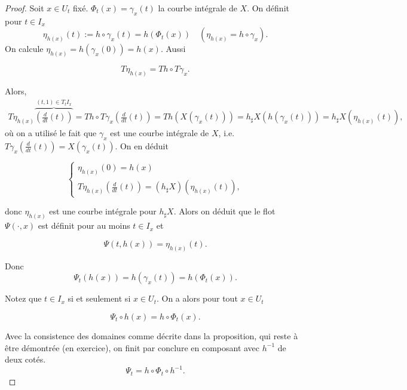 \documentclass[french]{article}
\theoremstyle{definition}
\begin{document}
\begin{proof}
  Soit $x\in U_t$ fix\'e. \(\Phi_t (x)  = \gamma_x(t)\) la courbe intégrale de \(X\). On d\'efinit pour $t\in I_x$
  \[
  \eta _{h(x)}(t) := h \circ \gamma_x(t) = h(\Phi_t(x)) \quad (\eta _{h(x)} = h \circ \gamma_x).
  \] On calcule \(\eta _{h(x)} = h(\gamma_x(0)) = h(x)\). Aussi

  \[T{\eta _{h(x)}} = T h \circ T \gamma_x.\]

  Alors,
    \begin{gather*}
    T{\eta _{h(x)}} \overbrace{\left( \frac{d}{dt}(t)\right) }^{(t,1)\in T_tI_x} = T h \circ {T{\gamma_x}\left(\frac{d}{dt}(t)\right)}  = Th(X (\gamma_x(t))) = h _{\sharp}X(h(\gamma_x(t))) = h _{\sharp}X(\eta _{h(x)}(t)),
  \end{gather*} o\`u on a utilis\'e  le fait que $\gamma_x$ est une courbe int\'egrale de $X$, i.e. ${T{\gamma_x}\left(\frac{d}{dt}(t)\right)} = X (\gamma_x(t))$.  On en d\'eduit

  \[\begin{cases}
    \eta _{h(x)}(0) = h(x) \\
    T{\eta _{h(x)}}\left(\frac{d}{dt}(t)\right) = (h _{\sharp}X)(\eta _{h(x)}(t)),
  \end{cases}\]

  donc \(\eta _{h(x)}\) est une courbe intégrale pour \(h _{\sharp}X\). Alors on d\'eduit que le flot $\Psi(\cdot ,x)$ est d\'efinit pour au moins $t\in I_x$ et

  \[\Psi(t,h(x)) = \eta _{h(x)}(t).\]

  Donc \[\Psi_t(h(x)) = h(\gamma_x(t)) = h(\Phi_t(x)).\]

 Notez  que $t\in I_x$ si et seulement si  $x\in U_t$. On a alors pour tout $x\in U_t$

  \begin{equation}
    \Psi_t \circ h (x) = h \circ \Phi_t (x).
  \end{equation}

Avec la consistence des domaines comme d\'ecrite dans la proposition, qui reste \`a \^etre d\'emontr\'ee (en exercice), on finit par conclure en composant avec $h^{-1}$ de deux cot\'es.
\[
   \Psi_t = h \circ \Phi_t \circ h^{-1}.
\]
\end{proof}

\end{document}

